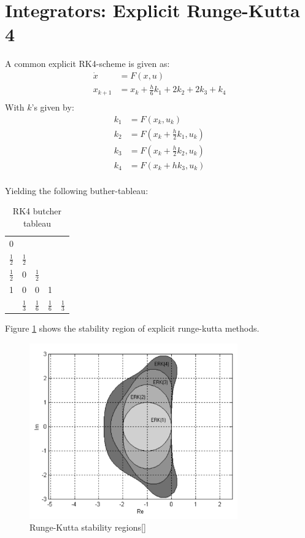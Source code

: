 \section{Integrators: Explicit Runge-Kutta 4}
A common explicit RK4-scheme is given as:
\begin{align}
    \dot{x} &= F(x,u)\\
    x_{k+1} &= x_k +\frac{h}{6}k_1 + 2k_2 + 2k_3 + k_4\\
\end{align}
With $k$'s given by:
\begin{align}
    k_1 &= F(x_k, u_k)\\
    k_2 &= F(x_k + \frac{h}{2}k_1, u_k)\\
    k_3 &= F(x_k + \frac{h}{2}k_2, u_k)\\
    k_4 &= F(x_k + hk_3, u_k)\\
\end{align}


Yielding the following buther-tableau:
\begin{table}[h]
    \centering
    \begin{tabular}{c|cccc}
         0 & & &  \\
         $\frac{1}{2}$& $\frac{1}{2}$ & &\\ $\frac{1}{2}$& 0 & $\frac{1}{2}$ & &\\
         1 & 0 & 0 & 1 &\\
         \hline &
         $\frac{1}{3}$ & $\frac{1}{6}$ & $\frac{1}{6}$ & $\frac{1}{3}$ 
         
    \end{tabular}
    \caption{RK4 butcher tableau}
    \label{tab:my_label}
\end{table}

Figure \ref{fig:RK4_Stability} shows the stability region of explicit runge-kutta methods.

\begin{figure}[h]
    \centering
    \includegraphics[width=0.8\textwidth]{Figures/RK_Stability_Region.PNG}
    \caption{Runge-Kutta stability regions[\cite{ModSimAuto}]}
    \label{fig:RK4_Stability}
\end{figure}


